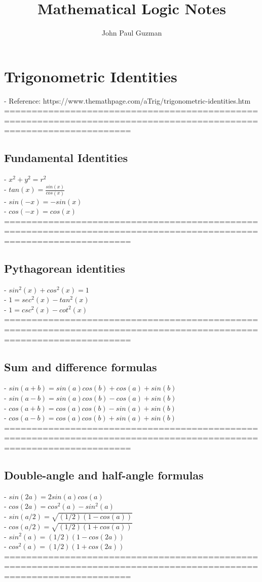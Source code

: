 \documentclass{book}
\title{Mathematical Logic Notes}
\author{John Paul Guzman}
\date{ }
\begin{document}
\maketitle

\chapter{Trigonometric Identities}
	- Reference: https://www.themathpage.com/aTrig/trigonometric-identities.htm \\
	===================================================================================================================
\section{Fundamental Identities}
	- $x^2 + y^2 = r^2$ \\ %
	- $tan(x) = \frac{sin(x)}{cos(x)}$ \\
	- $sin(-x) = -sin(x)$ \\
	- $cos(-x) = cos(x)$ \\
	===================================================================================================================
\section{Pythagorean identities}
	- $sin^2(x) + cos^2(x) = 1$ \\
	- $1 = sec^2(x) - tan^2(x)$ \\
	- $1 = csc^2(x) - cot^2(x)$ \\
	===================================================================================================================
\section{Sum and difference formulas}
	- $sin(a+b) = sin(a) cos(b) + cos(a) + sin(b)$ \\ %
	- $sin(a-b) = sin(a) cos(b) - cos(a) + sin(b)$ \\
	- $cos(a+b) = cos(a) cos(b) - sin(a) + sin(b)$ \\
	- $cos(a-b) = cos(a) cos(b) + sin(a) + sin(b)$ \\
	===================================================================================================================
\section{Double-angle and half-angle formulas}
	- $sin(2a) = 2 sin(a) cos(a)$ \\
	- $cos(2a) = cos^2(a) - sin^2(a)$ \\
	- $sin(a/2) = \sqrt{(1/2) (1 - cos(a))}$ \\
	- $cos(a/2) = \sqrt{(1/2) (1 + cos(a))}$ \\
	- $sin^2(a) = (1/2) (1 - cos(2a))$ \\
	- $cos^2(a) = (1/2) (1 + cos(2a))$ \\
	===================================================================================================================
\end{document}
